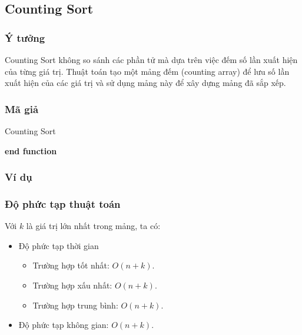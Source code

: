 \subsection{Counting Sort}

\subsubsection{Ý tưởng}

Counting Sort không so sánh các phần tử mà dựa trên việc đếm số lần xuất hiện của từng giá trị. Thuật toán tạo một mảng đếm (counting array) để lưu số lần xuất hiện của các giá trị và sử dụng mảng này để xây dựng mảng đã sắp xếp. 

\subsubsection{Mã giả}

\begin{algorithm}[H]
	\caption{Counting Sort}
	\label{counting-sort}
	
	\textbf{end function}
\end{algorithm}

\subsubsection{Ví dụ}

\subsubsection{Độ phức tạp thuật toán}

Với $k$ là giá trị lớn nhất trong mảng, ta có:

\begin{itemize}
	\item Độ phức tạp thời gian
	\begin{itemize}[label=$\circ$]
		\item Trường hợp tốt nhất: $O(n+k)$.
		\item Trường hợp xấu nhất: $O(n+k)$.
		\item Trường hợp trung bình: $O(n+k)$. 
	\end{itemize}
	
	\item Độ phức tạp không gian: $O(n + k)$.
\end{itemize}